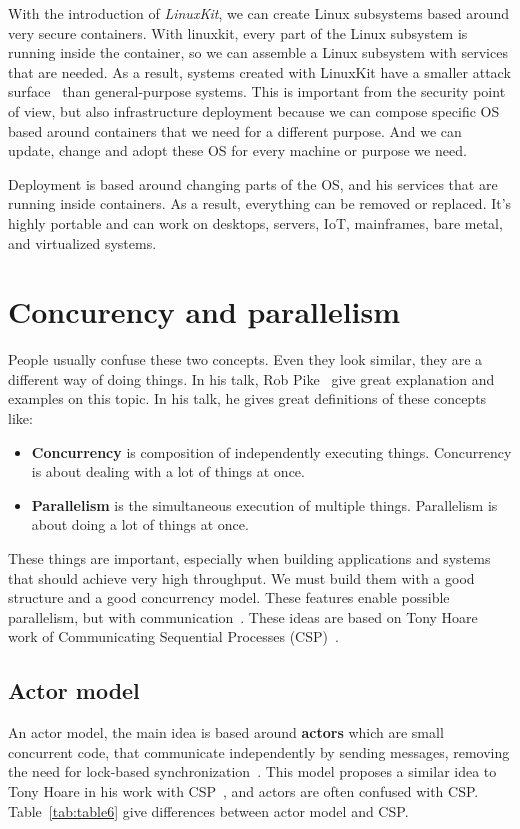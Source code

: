 With the introduction of \textit{LinuxKit}, we can create Linux subsystems based around very secure containers. With linuxkit, every part of the Linux subsystem is running inside the container, so we can assemble a Linux subsystem with services that are needed. As a result, systems created with LinuxKit have a smaller attack surface~\cite{abs-1802-10375} than general-purpose systems. This is important from the security point of view, but also infrastructure deployment because we can compose specific OS based around containers that we need for a different purpose. And we can update, change and adopt these OS for every machine or purpose we need.

Deployment is based around changing parts of the OS, and his services that are running inside containers. As a result, everything can be removed or replaced. It's highly portable and can work on desktops, servers, IoT, mainframes, bare metal, and virtualized systems.
%
%
\section{Concurency and parallelism}\label{sec:concurency_parallelism}
%
People usually confuse these two concepts. Even they look similar, they are a different way of doing things. In his talk, Rob Pike~\cite{Pike} give great explanation and examples on this topic. In his talk, he gives great definitions of these concepts like:

\begin{itemize}
	\item \textbf{Concurrency} is composition of independently executing things. Concurrency is about dealing with a lot of things at once.
	\item \textbf{Parallelism} is the simultaneous execution of multiple things. Parallelism is about doing a lot of things at once. 
\end{itemize}

These things are important, especially when building applications and systems that should achieve very high throughput. We must build them with a good structure and a good concurrency model. These features enable possible parallelism, but with communication~\cite{Pike}. These ideas are based on Tony Hoare work of Communicating Sequential Processes (CSP)~\cite{Hoare78}.

\subsection{Actor model}\label{sec:actor_model}
%
An actor model, the main idea is based around \textbf{actors} which are small concurrent code, that communicate independently by sending messages, removing the need for lock-based synchronization~\cite{Hewitt}. This model proposes a similar idea to Tony Hoare in his work with CSP~\cite{Hoare78}, and actors are often confused with CSP. Table~\ref{tab:table6} give differences between actor model and CSP.

